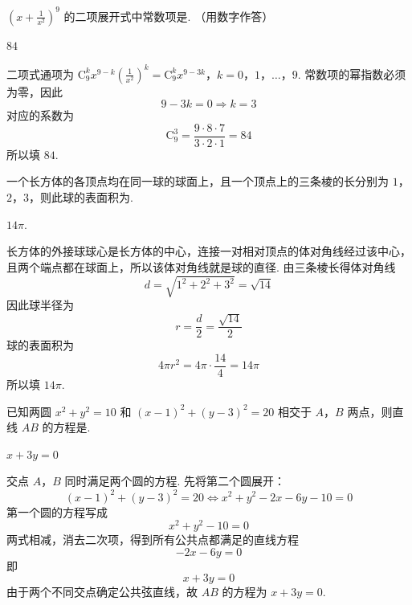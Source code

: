 \begin{problem}
\(\left(x + \frac{1}{x^2}\right)^9\) 的二项展开式中常数项是\fillinblank{}. （用数字作答）
\end{problem}

\begin{answer}
\(84\)
\end{answer}

\begin{solution}
二项式通项为
\(\mathrm C_9^k x^{9-k}\left(\frac1{x^2}\right)^k =\mathrm C_9^k x^{9-3k}\)，\(k=0\)，\(1\)，\(\ldots\)，\(9\).
常数项的幂指数必须为零，因此
\[
9-3k=0\Longrightarrow k=3
\]
对应的系数为
\[
\mathrm C_9^3=\frac{9\cdot8\cdot7}{3\cdot2\cdot1}=84
\]
所以填 \(84\).
\end{solution}

\begin{problem}
一个长方体的各顶点均在同一球的球面上，且一个顶点上的三条棱的长分别为 \(1\)，\(2\)，\(3\)，则此球的表面积为\fillinblank{}.
\end{problem}

\begin{answer}
\(14\pi\).
\end{answer}

\begin{solution}
长方体的外接球球心是长方体的中心，连接一对相对顶点的体对角线经过该中心，且两个端点都在球面上，所以该体对角线就是球的直径. 由三条棱长得体对角线
\[
d=\sqrt{1^2+2^2+3^2}=\sqrt{14}
\]
因此球半径为
\[
r=\frac d2=\frac{\sqrt{14}}2
\]
球的表面积为
\[
4\pi r^2=4\pi\cdot\frac{14}{4}=14\pi
\]
所以填 \(14\pi\).
\end{solution}

\begin{problem}
已知两圆 \( x^{2} + y^{2} = 10 \) 和 \( (x - 1)^{2} + (y - 3)^{2} = 20 \) 相交于 \(A\)，\(B\) 两点，则直线 \(AB\) 的方程是\fillinblank{}.
\end{problem}

\begin{answer}
\(x+3y=0\)
\end{answer}

\begin{solution}
交点 \(A\)，\(B\) 同时满足两个圆的方程. 先将第二个圆展开：
\[
(x-1)^2+(y-3)^2=20
\Longleftrightarrow x^2+y^2-2x-6y-10=0
\]
第一个圆的方程写成
\[
x^2+y^2-10=0
\]
两式相减，消去二次项，得到所有公共点都满足的直线方程
\[
-2x-6y=0
\]
即
\[
x+3y=0
\]
由于两个不同交点确定公共弦直线，故 \(AB\) 的方程为 \(x+3y=0\).
\end{solution}

